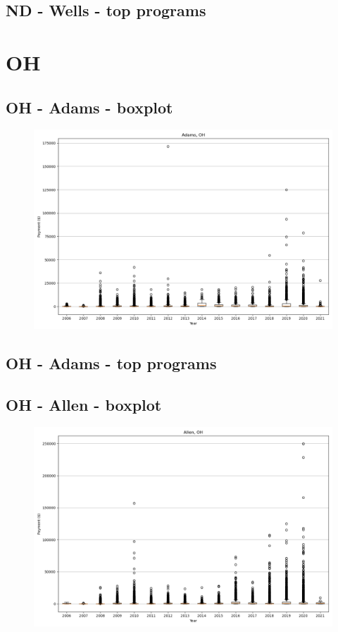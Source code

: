 \subsection*{ND - Wells - top programs}

\newpage
\section*{OH}
\subsection*{OH - Adams - boxplot}
\begin{figure}[h]
\centering
\includegraphics[width=7in]{../output/boxplots/counties/Adams-OH_boxplot.png}
\end{figure}


\subsection*{OH - Adams - top programs}

\newpage
\subsection*{OH - Allen - boxplot}
\begin{figure}[h]
\centering
\includegraphics[width=7in]{../output/boxplots/counties/Allen-OH_boxplot.png}
\end{figure}


